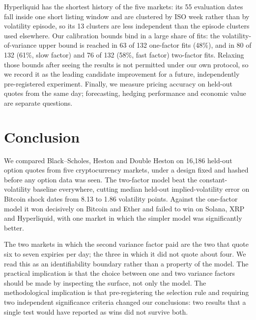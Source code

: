 \documentclass[runningheads]{llncs}
\begin{document}
Hyperliquid has the shortest history of the five markets: its 55 evaluation
dates fall inside one short listing window and are clustered by ISO week rather
than by volatility episode, so its 13 clusters are less independent than the
episode clusters used elsewhere. Our calibration
bounds bind in a large share of fits: the volatility-of-variance upper bound is
reached in 63 of 132 one-factor fits (48\%), and in 80 of 132 (61\%, slow
factor) and 76 of 132 (58\%, fast factor) two-factor fits. Relaxing those bounds after seeing the results is not
permitted under our own protocol, so we record it as the leading candidate
improvement for a future, independently pre-registered experiment. Finally, we
measure pricing accuracy on held-out quotes from the same day; forecasting,
hedging performance and economic value are separate questions.

\section{Conclusion}

We compared Black--Scholes, Heston and Double Heston on 16,186 held-out
option quotes from five cryptocurrency markets, under a design fixed and hashed before any
option data was seen. The two-factor model beat the constant-volatility
baseline everywhere, cutting median held-out implied-volatility error on
Bitcoin shock dates from 8.13 to 1.86 volatility points. Against the one-factor
model it won decisively on Bitcoin and Ether and failed to win on Solana, XRP
and Hyperliquid, with one market in which the simpler model was significantly
better.

The two markets in which the second variance factor paid are the two that quote
six to seven expiries per day; the three in which it did not quote about four.
We read this as an identifiability boundary rather than a property of the
model. The practical implication is that the choice between one and two
variance factors should be made by inspecting the surface, not only the model.
The methodological implication is that pre-registering the selection rule and
requiring two independent significance criteria changed our conclusions: two
results that a single test would have reported as wins did not survive both.
\end{document}

